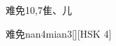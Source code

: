 \begin{entry}{难免}{10,7}{⾫、⼉}
  \begin{phonetics}{难免}{nan4mian3}[][HSK 4]
  \end{phonetics}
\end{entry}

